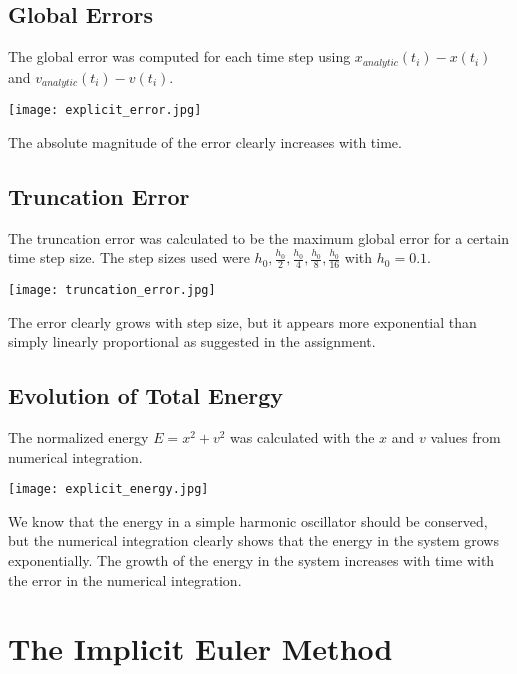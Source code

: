 \documentclass{article}
\begin{document}
\subsection{Global Errors}
The global error was computed for each time step using $ x_{analytic}(t_i) - x(t_i) $ and $ v_{analytic}(t_i) - v(t_i) $.

\texttt{[image: explicit\_error.jpg]}

The absolute magnitude of the error clearly increases with time.

\subsection{Truncation Error}
The truncation error was calculated to be the maximum global error for a certain time step size. The step sizes used were $h_0, \frac{h_0}{2}, \frac{h_0}{4}, \frac{h_0}{8}, \frac{h_0}{16}$ with $h_0 = 0.1$.

\texttt{[image: truncation\_error.jpg]}

The error clearly grows with step size, but it appears more exponential than simply linearly proportional as suggested in the assignment.

\subsection{Evolution of Total Energy}
The normalized energy $E = x^2 + v^2 $ was calculated with the $x$ and $v$ values from numerical integration.

\texttt{[image: explicit\_energy.jpg]}

We know that the energy in a simple harmonic oscillator should be conserved, but the numerical integration clearly shows that the energy in the system grows exponentially. The growth of the energy in the system increases with time with the error in the numerical integration.

\section{The Implicit Euler Method}
\end{document}
